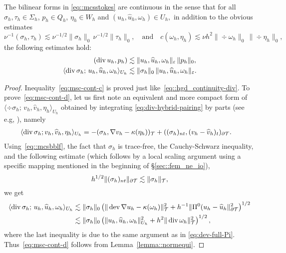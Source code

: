 \begin{lemma}
  \label{th:mcscontinuity}
  The bilinear forms in \eqref{eq::mcsstokes} are
  continuous in the sense that for all $\sigma_h ,\tau_h \in \Sigma_h$,
  $p_h \in Q_h$, $\eta_h \in W_h$ and $ (u_h,\hat u_h, \omega_h) \in
  U_h,$ in addition to the obvious estimates
  \[
    \nu^{-1}(\sigma_h,\tau_h)
    \lesssim {{\nu}}^{-1/2}  \| \sigma_h \|_0\, {{\nu}}^{-1/2}  \| \tau_h \|_0,
    \quad \textrm{and} \quad
    c(\omega_h, \eta_h)
    \lesssim \nu h^2 \| \div\omega_h \|_0\, \|\div\eta_h\|_0,
  \]
  the following estimates  hold:
  \begin{subequations}
    \label{eq:msc-cont}
    \begin{align}
      \label{eq:msc-cont-c}
      (\operatorname{div} u_h, p_h)
      &\lesssim \| u_h,\widehat u_h, \omega_h\|_{\varepsilon} \,\| p_h \|_{0},
      \\     \label{eq:msc-cont-d}
      \langle \operatorname{div}\sigma_h; \, u_h,\widehat u_h, \omega_h \rangle_{U_h}
      &\lesssim \| \sigma_h \|_0 \,\|u_h,\widehat u_h, \omega_h \|_{\varepsilon}.
    \end{align}
  \end{subequations}
\end{lemma}
\begin{proof}
  Inequality~\eqref{eq:msc-cont-c} is proved just
  like~\eqref{eq::hgd_continuity-div}. To prove~\eqref{eq:msc-cont-d},
  let us first note an equivalent and more compact form of $\langle
  \div\sigma_h;\, v_h,\hat v_h, \eta_h \rangle_{U_h}$ obtained by
  integrating \eqref{eq:div-hybrid-pairing} by parts (see e.g,
  \cite[eq.~(3.11)]{mcsII}), namely
  \begin{align} \label{eq::mcsbblf}
    \langle \operatorname{div}\sigma_h;\, 
    & v_h,\widehat v_h, \eta_h \rangle_{U_h} 
      = -(\sigma_h, \nabla v_h - \kappa(\eta_h))_{\mathcal{T}}
      + ( (\sigma_h)_{nt},  (v_h - \widehat v_h)_t)_{\partial \mathcal{T}}.
  \end{align}
  Using~\eqref{eq::mcsbblf}, the fact that $\sigma_h$ is trace-free,
  the Cauchy-Schwarz inequality, and the following estimate (which follows by a local scaling argument using a specific mapping mentioned in the beginning of \S\ref{sec::fem_ne_io}), 
  \begin{equation}
    \label{eq:easy-to-prove}
      h^{1/2} \| (\sigma_h)_{nt} \|_{\partial \mathcal{T}} \lesssim \| \sigma_h
  \|_{\mathcal{T}},
  \end{equation}
  we get 
  \begin{align*}
    \langle \operatorname{div}\sigma_h; \, u_h,\widehat u_h, \omega_h \rangle_{U_h}
    & \lesssim \| \sigma_h \|_0 \left(
      \| \operatorname{dev} \nabla u_h - \kappa(\omega_h) \|^2_{\mathcal{T}}
      + h^{-1} \| \Pi^0( u_h - \widehat u_h\|_{\partial \mathcal{T}}^2
      \right)^{1/2}
    \\
    & \lesssim \| \sigma_h\|_0
      \left( \| u_h,\widehat u_h, \omega_h\|_{U_h}^2
      + h^2 \| \operatorname{div}\omega_h \|_{\mathcal{T}}^2\right)^{1/2},
  \end{align*}
  where the last inequality is due to the same argument as in
  \eqref{eq:dev-full-Pi}. Thus~\eqref{eq:msc-cont-d} follows from
  Lemma~\ref{lemma::normequi}.
  \qqed
\end{proof}



